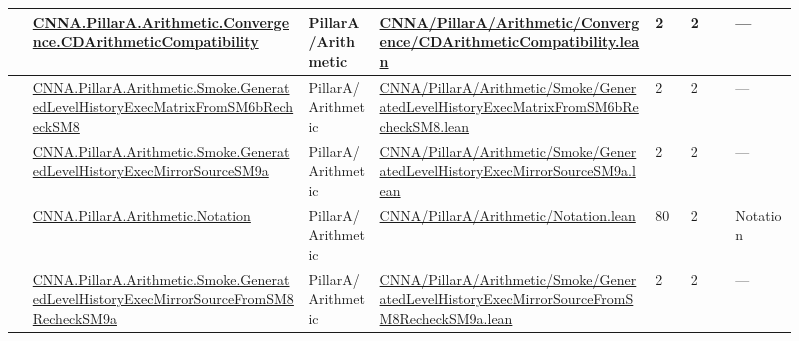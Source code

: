 \begin{longtable}{L{0.025\linewidth} L{0.315\linewidth} L{0.08\linewidth} L{0.315\linewidth} L{0.045\linewidth} L{0.055\linewidth} L{0.07\linewidth}}
\hline
{} & \href{run:repo_snapshot/CNNA/PillarA/Arithmetic/Convergence/CDArithmeticCompatibility.lean}{CNNA.\allowbreak{}PillarA.\allowbreak{}Arithmetic.\allowbreak{}Convergence.\allowbreak{}CDArithmeticCompatibility} & PillarA/\allowbreak{}Arithmetic & \href{run:repo_snapshot/CNNA/PillarA/Arithmetic/Convergence/CDArithmeticCompatibility.lean}{CNNA/\allowbreak{}PillarA/\allowbreak{}Arithmetic/\allowbreak{}Convergence/\allowbreak{}CDArithmeticCompatibility.\allowbreak{}lean} & 2 & 2 & ---\\
\hline
{} & \href{run:repo_snapshot/CNNA/PillarA/Arithmetic/Smoke/GeneratedLevelHistoryExecMatrixFromSM6bRecheckSM8.lean}{CNNA.\allowbreak{}PillarA.\allowbreak{}Arithmetic.\allowbreak{}Smoke.\allowbreak{}GeneratedLevelHistoryExecMatrixFromSM6bRecheckSM8} & PillarA/\allowbreak{}Arithmetic & \href{run:repo_snapshot/CNNA/PillarA/Arithmetic/Smoke/GeneratedLevelHistoryExecMatrixFromSM6bRecheckSM8.lean}{CNNA/\allowbreak{}PillarA/\allowbreak{}Arithmetic/\allowbreak{}Smoke/\allowbreak{}GeneratedLevelHistoryExecMatrixFromSM6bRecheckSM8.\allowbreak{}lean} & 2 & 2 & ---\\
\hline
{} & \href{run:repo_snapshot/CNNA/PillarA/Arithmetic/Smoke/GeneratedLevelHistoryExecMirrorSourceSM9a.lean}{CNNA.\allowbreak{}PillarA.\allowbreak{}Arithmetic.\allowbreak{}Smoke.\allowbreak{}GeneratedLevelHistoryExecMirrorSourceSM9a} & PillarA/\allowbreak{}Arithmetic & \href{run:repo_snapshot/CNNA/PillarA/Arithmetic/Smoke/GeneratedLevelHistoryExecMirrorSourceSM9a.lean}{CNNA/\allowbreak{}PillarA/\allowbreak{}Arithmetic/\allowbreak{}Smoke/\allowbreak{}GeneratedLevelHistoryExecMirrorSourceSM9a.\allowbreak{}lean} & 2 & 2 & ---\\
\hline
{} & \href{run:repo_snapshot/CNNA/PillarA/Arithmetic/Notation.lean}{CNNA.\allowbreak{}PillarA.\allowbreak{}Arithmetic.\allowbreak{}Notation} & PillarA/\allowbreak{}Arithmetic & \href{run:repo_snapshot/CNNA/PillarA/Arithmetic/Notation.lean}{CNNA/\allowbreak{}PillarA/\allowbreak{}Arithmetic/\allowbreak{}Notation.\allowbreak{}lean} & 80 & 2 & Notation\\
\hline
{} & \href{run:repo_snapshot/CNNA/PillarA/Arithmetic/Smoke/GeneratedLevelHistoryExecMirrorSourceFromSM8RecheckSM9a.lean}{CNNA.\allowbreak{}PillarA.\allowbreak{}Arithmetic.\allowbreak{}Smoke.\allowbreak{}GeneratedLevelHistoryExecMirrorSourceFromSM8RecheckSM9a} & PillarA/\allowbreak{}Arithmetic & \href{run:repo_snapshot/CNNA/PillarA/Arithmetic/Smoke/GeneratedLevelHistoryExecMirrorSourceFromSM8RecheckSM9a.lean}{CNNA/\allowbreak{}PillarA/\allowbreak{}Arithmetic/\allowbreak{}Smoke/\allowbreak{}GeneratedLevelHistoryExecMirrorSourceFromSM8RecheckSM9a.\allowbreak{}lean} & 2 & 2 & ---\\

\end{longtable}
